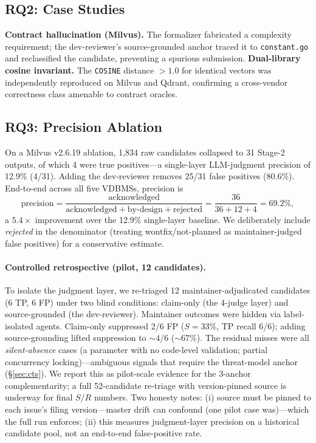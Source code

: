 \documentclass[sigconf, anonymous, review]{acmart}
\begin{document}
\subsection{RQ2: Case Studies}
\textbf{Contract hallucination (Milvus).} The formalizer fabricated a complexity requirement; the dev-reviewer's source-grounded anchor traced it to \texttt{constant.go} and reclassified the candidate, preventing a spurious submission.
\textbf{Dual-library cosine invariant.} The \texttt{COSINE} distance $>1.0$ for identical vectors was independently reproduced on Milvus and Qdrant, confirming a cross-vendor correctness class amenable to contract oracles.

\subsection{RQ3: Precision Ablation}\label{sec:eval-rq3}
On a Milvus v2.6.19 ablation, 1{,}834 raw candidates collapsed to 31 Stage-2 outputs, of which 4 were true positives---a single-layer LLM-judgment precision of 12.9\% (4/31). Adding the dev-reviewer removes 25/31 false positives (80.6\%). End-to-end across all five VDBMSs, precision is
\[
\mathrm{precision} = \frac{\mathrm{acknowledged}}{\mathrm{acknowledged} + \mathrm{by\text{-}design} + \mathrm{rejected}} = \frac{36}{36+12+4} = 69.2\%,
\]
a $5.4\times$ improvement over the 12.9\% single-layer baseline. We deliberately include \emph{rejected} in the denominator (treating wontfix/not-planned as maintainer-judged false positives) for a conservative estimate.

\paragraph{Controlled retrospective (pilot, 12 candidates).} To isolate the judgment layer, we re-triaged 12 maintainer-adjudicated candidates (6 TP, 6 FP) under two blind conditions: claim-only (the 4-judge layer) and source-grounded (the dev-reviewer). Maintainer outcomes were hidden via label-isolated agents. Claim-only suppressed 2/6 FP ($S{=}33\%$, TP recall 6/6); adding source-grounding lifted suppression to ${\sim}4/6$ (${\sim}67\%$). The residual misses were all \emph{silent-absence} cases (a parameter with no code-level validation; partial concurrency locking)---ambiguous signals that require the threat-model anchor (\S\ref{sec:cts}). We report this as pilot-scale evidence for the 3-anchor complementarity; a full 52-candidate re-triage with version-pinned source is underway for final $S/R$ numbers. Two honesty notes: (i) source must be pinned to each issue's filing version---master drift can confound (one pilot case was)---which the full run enforces; (ii) this measures judgment-layer precision on a historical candidate pool, not an end-to-end false-positive rate.
\end{document}

